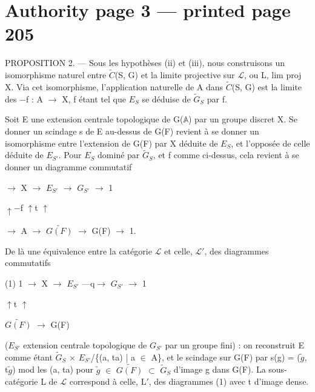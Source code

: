 \documentclass[10pt,a4paper]{article}
\begin{document}
\section*{Authority page 3 --- printed page 205}
\noindent PROPOSITION 2. — Sous les hypothèses (ii) et (iii), nous construisons un isomorphisme naturel entre \ensuremath{\widetilde{C}}(S, G) et la limite projective sur \ensuremath{ℒ}, ou L, lim proj X. Via cet isomorphisme, l'application naturelle de A dans \ensuremath{\widetilde{C}}(S, G) est la limite des \ensuremath{−}f : A \ensuremath{→} X, f étant tel que \ensuremath{E_S} se déduise de \ensuremath{\widetilde{G}_S} par f.\par
\smallskip
\noindent Soit E une extension centrale topologique de G(\ensuremath{𝔸}) par un groupe discret X. Se donner un scindage s de E au-dessus de G(F) revient à se donner un isomorphisme entre l'extension de G(F) par X déduite de \ensuremath{E_S}, et l'opposée de celle déduite de \ensuremath{E_{S′}}. Pour \ensuremath{E_S} dominé par \ensuremath{\widetilde{G}_S}, et f comme ci-dessus, cela revient à se donner un diagramme commutatif\par
\smallskip
{} \ensuremath{→} X \ensuremath{→} \ensuremath{E_{S′}} \ensuremath{→} \ensuremath{G_{S′}} \ensuremath{→} 1\par
\noindent     \ensuremath{↑−}f    \ensuremath{↑}t         \ensuremath{↑}\par
{} \ensuremath{→} A \ensuremath{→} \ensuremath{\widetilde{G(F)}} \ensuremath{→} G(F) \ensuremath{→} 1.\par
\smallskip
\noindent De là une équivalence entre la catégorie \ensuremath{ℒ} et celle, \ensuremath{ℒ′}, des diagrammes commutatifs\par
\smallskip
\noindent (1)    1 \ensuremath{→} X \ensuremath{→} \ensuremath{E_{S′}} —q\ensuremath{→} \ensuremath{G_{S′}} \ensuremath{→} 1\par
\noindent                  \ensuremath{↑}t          \ensuremath{↑}\par
\noindent               \ensuremath{\widetilde{G(F)}} \ensuremath{→} G(F)\par
\smallskip
\noindent (\ensuremath{E_{S′}} extension centrale topologique de \ensuremath{G_{S′}} par un groupe fini) : on reconstruit E comme étant \ensuremath{\widetilde{G}_S} \ensuremath{×} \ensuremath{E_{S′}}/\{(a, ta) | a \ensuremath{∈} A\}, et le scindage sur G(F) par s(g) = (\ensuremath{\widetilde{g}}, t\ensuremath{\widetilde{g}}) mod les (a, ta) pour \ensuremath{\widetilde{g}} \ensuremath{∈} \ensuremath{\widetilde{G(F)}} \ensuremath{⊂} \ensuremath{\widetilde{G}_S} d'image g dans G(F). La sous-catégorie L de \ensuremath{ℒ} correspond à celle, L\ensuremath{′}, des diagrammes (1) avec t d'image dense.\par
\end{document}
